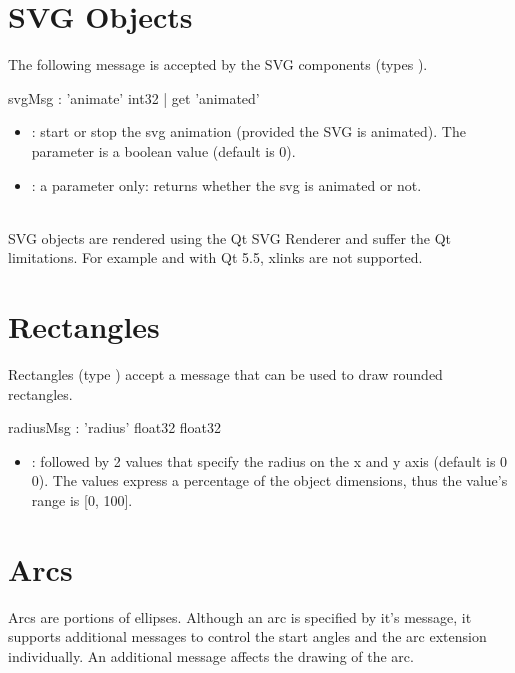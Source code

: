 \documentclass[a4paper,twoside]{report}
\newcommand{\sublevel}[1]	{\section{#1}}
\begin{document}
\sublevel{SVG Objects}
\label{svgobjects}

The following message is accepted by the SVG components (types ).


\begin{rail}
svgMsg :		'animate' int32
		| get 'animated'
\end{rail}

\begin{itemize}
\item {}: start or stop the svg animation (provided the SVG is animated). The parameter is a boolean value (default is 0).
\item {}: a  parameter only: returns whether the svg is animated or not.
\end{itemize}

\note\\
SVG objects are rendered using the Qt SVG Renderer and suffer the Qt limitations. For example and with Qt 5.5, xlinks are not supported.


\sublevel{Rectangles}
\label{rectobjects}

Rectangles (type ) accept a  message that can be used to draw rounded rectangles.


\begin{rail}
radiusMsg :		'radius' float32 float32
\end{rail}

\begin{itemize}
\item {}: followed by 2 values that specify the radius on the x and y axis (default is 0 0). The values express a percentage of the object dimensions, thus the value's range is [0, 100].
\end{itemize} 


\sublevel{Arcs}
\label{arcobjects}

Arcs are portions of ellipses.
Although an arc is specified by it's  message, it supports additional messages to control the start angles and the arc extension individually. An additional  message affects the drawing of the arc.

\end{document}
